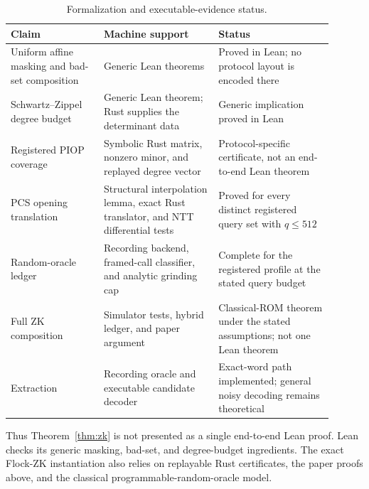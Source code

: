 \documentclass[11pt]{article}
\theoremstyle{definition}
\begin{document}
\begin{table}[ht]
\centering\small
\caption{Formalization and executable-evidence status.}
\label{tab:formalization}
\begin{tabular}{@{}>{\raggedright\arraybackslash}p{0.26\linewidth}
                  >{\raggedright\arraybackslash}p{0.32\linewidth}
                  >{\raggedright\arraybackslash}p{0.32\linewidth}@{}}
\toprule
Claim & Machine support & Status \\
\midrule
Uniform affine masking and bad-set composition
  & Generic Lean theorems
  & Proved in Lean; no protocol layout is encoded there \\
Schwartz--Zippel degree budget
  & Generic Lean theorem; Rust supplies the determinant data
  & Generic implication proved in Lean \\
Registered PIOP coverage
  & Symbolic Rust matrix, nonzero minor, and replayed degree vector
  & Protocol-specific certificate, not an end-to-end Lean theorem \\
PCS opening translation
  & Structural interpolation lemma, exact Rust translator, and NTT differential tests
  & Proved for every distinct registered query set with $q\le512$ \\
Random-oracle ledger
  & Recording backend, framed-call classifier, and analytic grinding cap
  & Complete for the registered profile at the stated query budget \\
Full ZK composition
  & Simulator tests, hybrid ledger, and paper argument
  & Classical-ROM theorem under the stated assumptions; not one Lean theorem \\
Extraction
  & Recording oracle and executable candidate decoder
  & Exact-word path implemented; general noisy decoding remains theoretical \\
\bottomrule
\end{tabular}
\end{table}

Thus Theorem~\ref{thm:zk} is not presented as a single end-to-end Lean proof.
Lean checks its generic masking, bad-set, and degree-budget ingredients.  The
exact Flock-ZK instantiation also relies on replayable Rust certificates, the
paper proofs above, and the classical programmable-random-oracle model.
\end{document}
